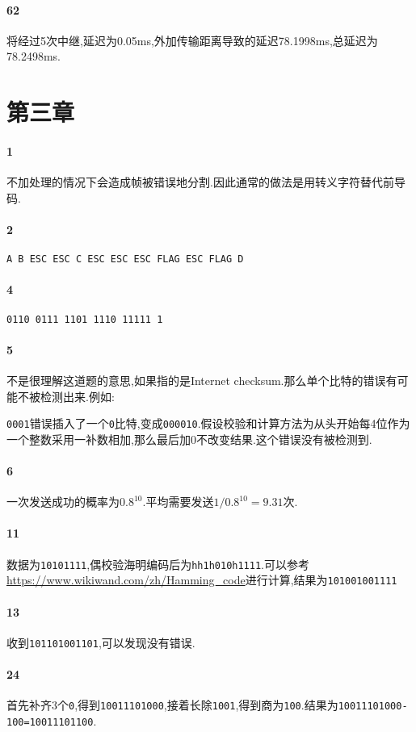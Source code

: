 \documentclass[a4paper]{article}
\begin{document}
\paragraph{62}
将经过5次中继,延迟为0.05ms,外加传输距离导致的延迟78.1998ms,总延迟为78.2498ms.
\section{第三章}
\paragraph{1}
不加处理的情况下会造成帧被错误地分割.因此通常的做法是用转义字符替代前导码.
\paragraph{2}
\verb|A B ESC ESC C ESC ESC ESC FLAG ESC FLAG D|
\paragraph{4}
\verb|0110 0111 1101 1110 11111 1|
\paragraph{5}
不是很理解这道题的意思,如果指的是Internet checksum.那么单个比特的错误有可能不被检测出来.例如:

\verb|0001|错误插入了一个\verb|0|比特,变成\verb|000010|.假设校验和计算方法为从头开始每4位作为一个整数采用一补数相加,那么最后加0不改变结果.这个错误没有被检测到.
\paragraph{6}
一次发送成功的概率为$0.8^{10}$.平均需要发送$1/0.8^{10}=9.31$次.
\paragraph{11}
数据为\verb|10101111|,偶校验海明编码后为\verb|hh1h010h1111|.可以参考\url{https://www.wikiwand.com/zh/Hamming_code}进行计算,结果为\verb|101001001111|
\paragraph{13}
收到\verb|101101001101|,可以发现没有错误.
\paragraph{24}
首先补齐3个\verb|0|,得到\verb|10011101000|,接着长除\verb|1001|,得到商为\verb|100|.结果为\verb|10011101000-100=10011101100|.
\end{document}
